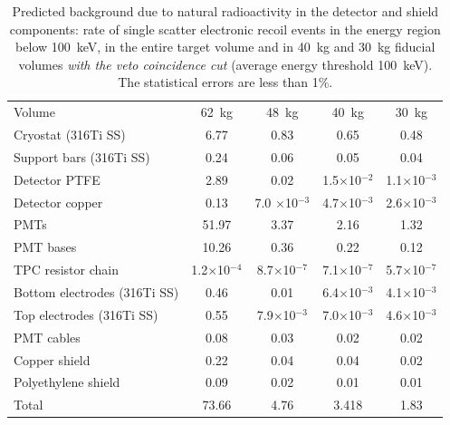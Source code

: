 \begin{table}[!t]
\centering
\caption[Predicted background due to natural radioactivity detector and shield components with the veto coincidence cut]{Predicted background due to natural radioactivity in the detector and shield components: rate of single scatter electronic recoil events in the energy region below 100~keV, in the entire target volume and in 40~kg and 30~kg fiducial volumes {\it with the veto coincidence cut} (average energy threshold 100~keV). The statistical errors are less than 1\%.}
\label{tabPredictedGammaActiveVeto}
\begin{tabular}{>{\footnotesize}l |>{\footnotesize} c |>{\footnotesize} c |>{\footnotesize} c |>{\footnotesize} c}
\hline
& \multicolumn{4}{>{\footnotesize}c}{Single electronic recoils [$\times$10$^{-3}$~events$\cdot$kg$^{-1}$$\cdot$day$^{-1}$$\cdot$keV$^{-1}$]}\\
\hline
Volume  & 62~kg & 48~kg & 40~kg  & 30~kg \\
\hline
Cryostat  (316Ti SS) 				& 6.77	& 0.83	& 0.65 		& 0.48 \\
Support bars (316Ti SS)			& 0.24	& 0.06	& 0.05 		& 0.04 \\
Detector PTFE 					& 2.89	& 0.02 	& 1.5$\times$10$^{-2}$ 		& 1.1$\times$10$^{-3}$ \\
Detector copper 				& 0.13	& 7.0	$\times$10$^{-3}$ & 4.7$\times$10$^{-3}$  & 2.6$\times$10$^{-3}$ \\
PMTs 						& 51.97	& 3.37	& 2.16 		& 1.32 \\
PMT bases	 				& 10.26	& 0.36	& 0.22 	 	& 0.12 \\
TPC resistor chain 				& 1.2$\times$10$^{-4}$  & 8.7$\times$10$^{-7}$  &  7.1$\times$10$^{-7}$  	& 5.7$\times$10$^{-7}$ \\
Bottom electrodes (316Ti SS) 		& 0.46	& 0.01	& 6.4$\times$10$^{-3}$ 	 	& 4.1$\times$10$^{-3}$ \\
Top electrodes (316Ti SS) 		& 0.55	& 7.9$\times$10$^{-3}$	& 7.0$\times$10$^{-3}$ 	 	& 4.6$\times$10$^{-3}$ \\
PMT cables 					& 0.08	& 0.03	& 0.02 	 	& 0.02 \\
Copper shield					& 0.22	& 0.04	& 0.04 	 	& 0.02 \\
Polyethylene shield				& 0.09	& 0.02	& 0.01 	 	& 0.01 \\
\hline
Total 						& 73.66  	& 4.76  	& 3.418 	 	& 1.83 \\
\hline
\end{tabular}
\end{table}

